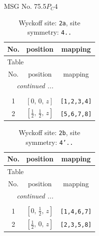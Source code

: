 \documentclass[fleqn,8pt]{jsarticle}
\begin{document}
\setcounter{MaxMatrixCols}{32}

\renewcommand{\tablename}{Table~}
\renewcommand{\figurename}{Figure~}
\begin{center}
\LARGE
MSG No. 75.5\quad$P_{C}4$
\end{center}
\renewcommand{\arraystretch}{1.2}
\begin{longtable}{ccc}
\caption{Wyckoff site: {\tt 2a}, site symmetry: {\tt 4..}}
 \\
 \hline \hline
No. & position & mapping \\ \hline \endfirsthead

\multicolumn{2}{l}{\tablename\ \thetable{}} \\
 \hline \hline
No. & position & mapping \\ \hline \endhead

 \hline \hline
\multicolumn{2}{r}{\footnotesize\it continued ...} \\ \endfoot

 \hline \hline
\multicolumn{2}{r}{} \\ \endlastfoot

1 & $\left[ 0,\, 0,\, z \right]$ & {\tt [1,2,3,4]} \\ \hline
2 & $\left[ \frac{1}{2},\, \frac{1}{2},\, z \right]$ & {\tt [5,6,7,8]} \\
\end{longtable}
\renewcommand{\arraystretch}{1.2}
\begin{longtable}{ccc}
\caption{Wyckoff site: {\tt 2b}, site symmetry: {\tt 4'..}}
 \\
 \hline \hline
No. & position & mapping \\ \hline \endfirsthead

\multicolumn{2}{l}{\tablename\ \thetable{}} \\
 \hline \hline
No. & position & mapping \\ \hline \endhead

 \hline \hline
\multicolumn{2}{r}{\footnotesize\it continued ...} \\ \endfoot

 \hline \hline
\multicolumn{2}{r}{} \\ \endlastfoot

1 & $\left[ 0,\, \frac{1}{2},\, z \right]$ & {\tt [1,4,6,7]} \\ \hline
2 & $\left[ \frac{1}{2},\, 0,\, z \right]$ & {\tt [2,3,5,8]} \\
\end{longtable}
\renewcommand{\arraystretch}{1.2}
\end{document}
